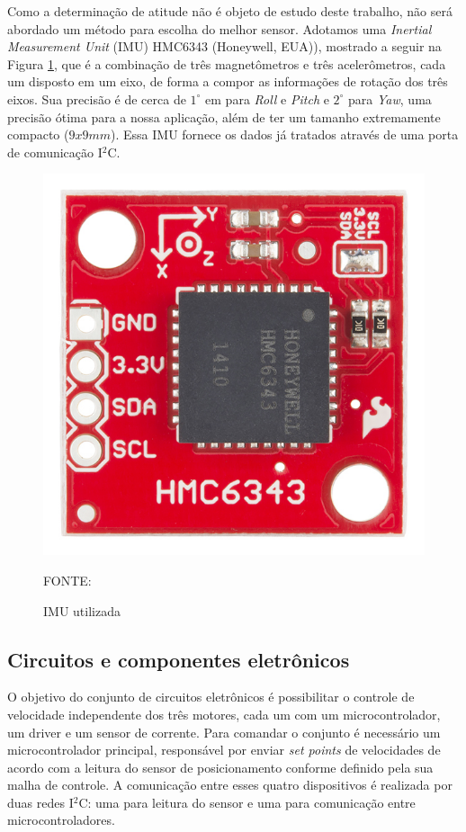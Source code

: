 \documentclass[
	12pt,				%
	openany,			%
	twoside,			%
	a4paper,			%
	english,			%
	french,				%
	spanish,			%
	brazil,				%
	oldfontcommands
	]{abntex2}
\begin{document}
Como a determinação de atitude não é objeto de estudo deste trabalho, não será abordado um método para escolha do melhor sensor. Adotamos uma \textit{Inertial Measurement Unit} (IMU) HMC6343 (Honeywell, EUA)), mostrado a seguir na Figura \ref{fig:IMU}, que é a combinação de três magnetômetros e três acelerômetros, cada um disposto em um eixo, de forma a compor as informações de rotação dos três eixos. Sua precisão é de cerca de $1^{\circ}$ em para \textit{Roll} e \textit{Pitch} e $2^{\circ}$ para \textit{Yaw}, uma precisão ótima para a nossa aplicação, além de ter um tamanho extremamente compacto ($9x9mm$). Essa IMU fornece os dados já tratados através de uma porta de comunicação I$^{2}$C.

\begin{figure}[th]
	\caption{IMU utilizada}
	\centering
	\includegraphics[width=0.5\linewidth]{./figs/IMU-HMC6343}
	
	\begin{small}
		FONTE: \cite{IMU}
	\end{small}
	\label{fig:IMU}
\end{figure}

\subsection{Circuitos e componentes eletrônicos}

O objetivo do conjunto de circuitos eletrônicos é possibilitar o controle de velocidade independente dos três motores, cada um com um microcontrolador, um driver e um sensor de corrente. Para comandar o conjunto é necessário um microcontrolador principal, responsável por enviar \textit{set points} de velocidades de acordo com a leitura do sensor de posicionamento conforme definido pela sua malha de controle. A comunicação entre esses quatro dispositivos é realizada por duas redes I$^{2}$C: uma para leitura do sensor e uma para comunicação entre microcontroladores.
\end{document}
